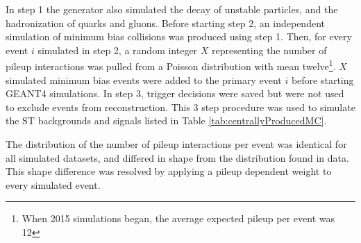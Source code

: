 In step 1 the \MC generator also simulated the decay of unstable particles, and the hadronization of quarks and gluons.  
Before starting step 2, an independent \MC simulation of minimum bias collisions was produced using step 1.  
Then, for every event $i$ simulated in step 2, a random integer $X$ representing the number of pileup interactions 
was pulled from a Poisson distribution with mean twelve\footnote{When 2015 \MC simulations began, the average expected 
pileup per event was 12}.  $X$ simulated minimum bias events were added to the primary event $i$ before starting GEANT4 
simulations.  In step 3, trigger decisions were saved but were not used to exclude events from reconstruction.  This 
3 step procedure was used to simulate the ST backgrounds and \WR signals listed in Table \ref{tab:centrallyProducedMC}.

The distribution of the number of pileup interactions per event was identical for all simulated datasets, and 
differed in shape from the distribution found in data.  This shape difference was resolved by applying a pileup 
dependent weight to every simulated event.

